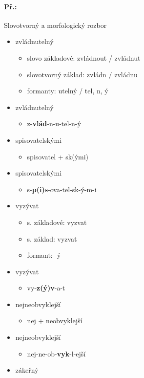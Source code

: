 \paragraph{Př.:} Slovotvorný a morfologický rozbor
\begin{itemize}
\item zvládnutelný
	\begin{itemize}
	\item slovo základové: zvládnout / zvládnut
	\item slovotvorný základ: zvládn / zvládnu
	\item formanty: utelný / tel, n, ý
	\end{itemize}
\item zvládnutelný
	\begin{itemize}
	\item z-\textbf{vlád}-n-u-tel-n-ý
	\end{itemize}
\item spisovatelskými
	\begin{itemize}
	\item spisovatel + sk(ými)
	\end{itemize}
\item spisovatelskými
	\begin{itemize}
	\item s-\textbf{p(i)s}-ova-tel-sk-ý-m-i
	\end{itemize}
\item vyzývat
	\begin{itemize}
	\item s. základové: vyzvat
	\item s. základ: vyzvat
	\item formant: -ý-	
	\end{itemize}
\item vyzývat
	\begin{itemize}
		\item vy-\textbf{z(ý)v}-a-t
	\end{itemize}
\item nejneobvyklejší
	\begin{itemize}
	\item nej + neobvyklejší
	\end{itemize}
\item nejneobvyklejší
	\begin{itemize}
	\item nej-ne-ob-\textbf{vyk}-l-ejší
	\end{itemize}
\item zákeřný
	\begin{itemize}

\end{itemize}
\end{itemize}
